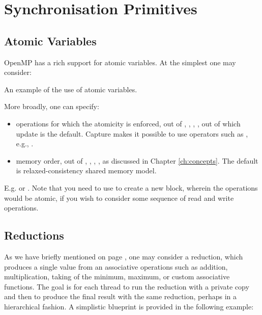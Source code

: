 \section{Synchronisation Primitives}

\subsection{Atomic Variables}

OpenMP has a rich support for atomic variables. 
At the simplest one may consider:

\raggedbottom
\begin{codebox}[]{\href{https://godbolt.org/z/baqqEMKEe}{\ExternalLink}}
\footnotesize An example of the use of atomic variables.
\tcblower
{}
\end{codebox}

More broadly, one can specify:
\begin{itemize}
\item operations for which the atomicity is enforced, out of ,  , , , out of which update is the default. Capture makes it possible to use operators such as \cpp{+=}, e.g., .
\item memory order, out of , , ,  ,   as discussed in Chapter \ref{ch:concepts}. The default is relaxed-consistency shared memory model.
\end{itemize}

E.g.  or .
Note that you need to use \cpp{{}} to create a new block, wherein the operations would be atomic, if you wish to consider some sequence of read and write operations. 

\subsection{Reductions}

As we have briefly mentioned on page \pageref{sec:reduction1}, one may consider a reduction, which produces a single value from an associative operations such as addition, multiplication, taking of the minimum, maximum, or custom associative functions. The goal is for each thread to run the reduction with a private copy and then to produce the final result with the same reduction, perhaps in a hierarchical fashion. A simplistic blueprint is provided in the following example:


